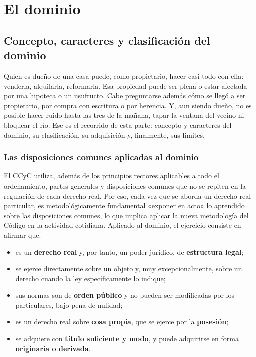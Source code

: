 \documentclass[12pt,oneside]{book}
\begin{document}
\part{El dominio}

\chapter[Concepto, caracteres y clasificación del dominio]{Concepto, caracteres y clasificación del dominio}\label{cap:dominio}

Quien es dueño de una casa puede, como propietario, hacer casi todo con ella: venderla, alquilarla, reformarla. Esa propiedad puede ser plena o estar afectada por una hipoteca o un usufructo. Cabe preguntarse además cómo se llegó a ser propietario, por compra con escritura o por herencia. Y, aun siendo dueño, no es posible hacer ruido hasta las tres de la mañana, tapar la ventana del vecino ni bloquear el río. Ese es el recorrido de esta parte: concepto y caracteres del dominio, su clasificación, su adquisición y, finalmente, sus límites.

\section{Las disposiciones comunes aplicadas al dominio}

El CCyC utiliza, además de los principios rectores aplicables a todo el ordenamiento, partes generales y disposiciones comunes que no se repiten en la regulación de cada derecho real. Por eso, cada vez que se aborda un derecho real particular, es metodológicamente fundamental «exponer en acto» lo aprendido sobre las disposiciones comunes, lo que implica aplicar la nueva metodología del Código en la actividad cotidiana. Aplicado al dominio, el ejercicio consiste en afirmar que:

\begin{itemize}
    \item es un \textbf{derecho real} y, por tanto, un poder jurídico, de \textbf{estructura legal};
    \item se ejerce directamente sobre un objeto y, muy excepcionalmente, sobre un derecho cuando la ley específicamente lo indique;
    \item sus normas son de \textbf{orden público} y no pueden ser modificadas por los particulares, bajo pena de nulidad;
    \item es un derecho real sobre \textbf{cosa propia}, que se ejerce por la \textbf{posesión};
    \item se adquiere con \textbf{título suficiente y modo}, y puede adquirirse en forma \textbf{originaria o derivada}.
\end{itemize}
\end{document}
